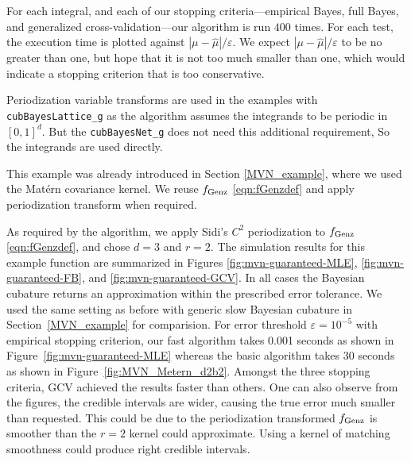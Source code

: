 \documentclass{iitthesis}          %
\newcommand{\hmu}{\widehat{\mu}}
\newcommand{\code}[1]{\texttt{#1}}
\def\abs#1{\ensuremath{\left \lvert #1 \right \rvert}}
\newcommand\figref{Figure~\ref}
\newcommand\secref{Section~\ref}
\begin{document}
For each integral, and each of our stopping criteria---empirical Bayes, full Bayes, and generalized cross-validation---our algorithm is run  $400$ times.  For each test, the execution time is plotted against $\abs{\mu - \hmu}/\varepsilon$.  We expect $\abs{\mu - \hmu}/\varepsilon$ to be no greater than one, but hope that it is not too much smaller than one, which would indicate a stopping criterion that is too conservative.


Periodization variable transforms are used in the examples with \allowbreak \code{cubBayesLattice\_g} as the algorithm assumes the integrands to be periodic in $[0,1]^d$. But the \allowbreak \code{cubBayesNet\_g} does not need this additional requirement, So the integrands are used directly.




This example was already introduced in Section \ref{MVN_example}, where we used the Mat\'ern covariance kernel.  We reuse $ f_{\textup{Genz}}$ \eqref{eqn:fGenzdef} and apply periodization transform when required.

\Subsection{Using \code{cubBayesLattice\_g}}
As required by the algorithm, we apply Sidi's $C^2$  periodization to $ f_{\textup{Genz}}$ \eqref{eqn:fGenzdef}, and chose $d=3$ and $r=2$. The simulation results for this example function are summarized in Figures \ref{fig:mvn-guaranteed-MLE}, \ref{fig:mvn-guaranteed-FB}, and \ref{fig:mvn-guaranteed-GCV}.  In all cases the Bayesian cubature returns an approximation within the prescribed error tolerance. We used the same setting as before with generic slow Bayesian cubature in \secref{MVN_example} for comparision. For error threshold $\varepsilon=10^{-5}$ with empirical stopping criterion, our fast algorithm takes 0.001 seconds as shown in \figref{fig:mvn-guaranteed-MLE} whereas the basic algorithm takes 30 seconds as shown in \figref{fig:MVN_Metern_d2b2}. 
Amongst the three stopping criteria, GCV achieved the results faster than others. 
One can also observe from the figures, the credible intervals are wider, causing the true error much smaller than requested.
This could be due to the periodization transformed $f_\textup{Genz}$ is smoother than the $r=2$ kernel could approximate. Using a kernel of matching smoothness could produce right credible intervals.
\end{document}
